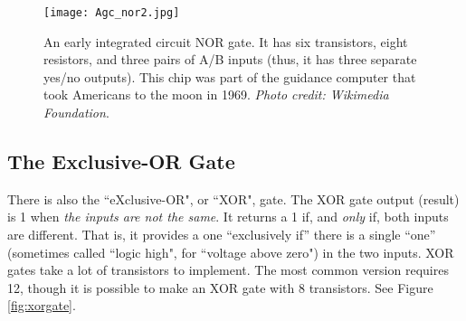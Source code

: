 \bigskip


\begin{figure}[!hb]
\begin{center}
\texttt{[image: Agc\_nor2.jpg]}
\caption{An early integrated circuit NOR gate. It has six transistors, eight resistors, and three pairs of A/B inputs (thus, it has three separate yes/no outputs). This chip was part of the guidance computer that took Americans to the moon in 1969. \emph{Photo credit: Wikimedia Foundation}.}
\end{center}
\label{fig:apollonorgate}
\end{figure}


\clearpage
\newpage

\subsection*{The Exclusive-OR Gate}
There is also the ``eXclusive-OR", or ``XOR", gate. The XOR gate output (result) is 1 when \emph{the inputs are not the same}. It returns a 1 if, and \emph{only} if, both inputs are different. That is, it provides a one ``exclusively if'' there is a single ``one'' (sometimes called ``logic high", for ``voltage above zero") in the two inputs. XOR gates take a lot of transistors to implement. The most common version requires 12, though it is possible to make an XOR gate with 8 transistors. See Figure \ref{fig:xorgate}.

